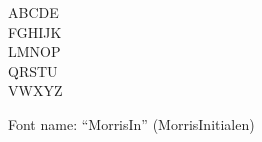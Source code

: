 \documentclass[a4paper]{article}
\begin{document}
\begin{center}
\fontsize{60pt}{72pt}
  ABCDE \\
  FGHIJK \\
  LMNOP \\
  QRSTU \\
  VWXYZ \\
\end{center}
\vfill
\begin{center}
Font name: ``MorrisIn'' (MorrisInitialen)
\end{center}
\end{document}
